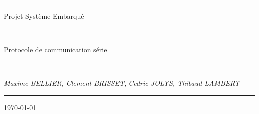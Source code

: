 \documentclass[a4paper,10pt]{article}
\begin{document}
\noindent{}
\rule{\textwidth}{1pt}
\begin{flushright}
  {\Huge Projet Système Embarqué}

~

  {\Large Protocole de communication série}

~

  {\large \textit{ Maxime BELLIER, Clement BRISSET, Cedric JOLYS, Thibaud LAMBERT }}
\end{flushright}
\rule{\textwidth}{1pt}
\thispagestyle{empty}
\begin{flushright} \today \end{flushright}

\newpage

\tableofcontents

\newpage





\end{document}
